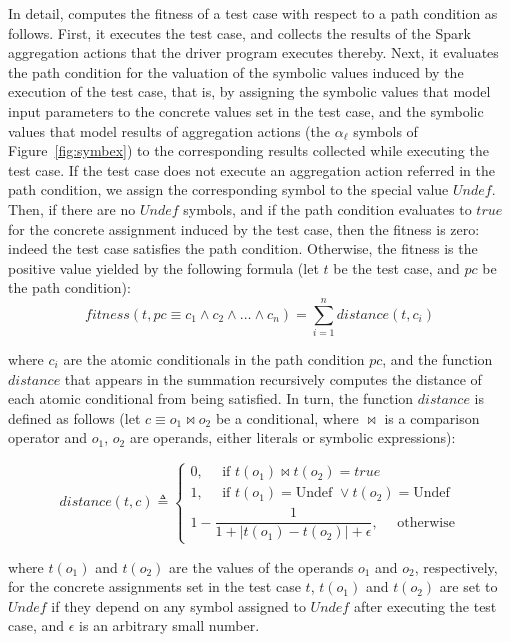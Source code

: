 In detail, \approach computes the fitness of a test case with respect to a path condition as follows. First, it executes the test case, and collects the results of the Spark aggregation actions that the driver program executes thereby. Next, it evaluates the path condition for the valuation of the symbolic values induced by the execution of the test case, that is, by assigning the symbolic values that model input parameters to the concrete values set in the test case, and the symbolic values that model results of aggregation actions (the $\alpha_\ell$ symbols of Figure~\ref{fig:symbex}) to the corresponding results collected while executing the test case. If the test case does not execute an aggregation action referred in the path condition, we assign the corresponding symbol to the special value $Undef$. Then, if there are no $Undef$ symbols, and if the path condition evaluates to $true$ for the concrete assignment induced by the test case, then the fitness is zero: indeed the test case satisfies the path condition. Otherwise, the fitness is the positive value yielded by the following formula (let $t$ be the test case, and $pc$ be the path condition):
%
\[fitness(t, pc\equiv c_1\wedge c_2\wedge\dots\wedge c_n) = \sum_{i=1}^{n} distance(t, c_i)\]

\noindent where $c_i$ are the atomic conditionals in the path condition $pc$, and the function $distance$ that appears in the summation recursively computes the distance of each atomic conditional from being satisfied. In turn, the function $distance$ is defined as follows (let $c \equiv o_1 \bowtie o_2$ be a conditional, where $\bowtie$ is a comparison operator and $o_1$, $o_2$ are operands, either literals or symbolic expressions): 

\[distance(t, c) \triangleq 
\begin{cases}
0, \text{~~~~if } t(o_1) \bowtie t(o_2)= true\\
1, \text{~~~~if } t(o_1)= \text{Undef } \vee t(o_2)= \text{Undef}\\
1-\dfrac{1}{1 + |t(o_1)-t(o_2)| + \epsilon},  \text{~~~~otherwise}
\end{cases}\]

\noindent where $t(o_1)$ and $t(o_2)$ are the values of the operands $o_1$ and $o_2$, respectively, for the concrete assignments set in the test case $t$,  $t(o_1)$ and $t(o_2)$ are set to $Undef$ if they depend on any symbol assigned to $Undef$ after executing the test case, and $\epsilon$ is an arbitrary small number.

